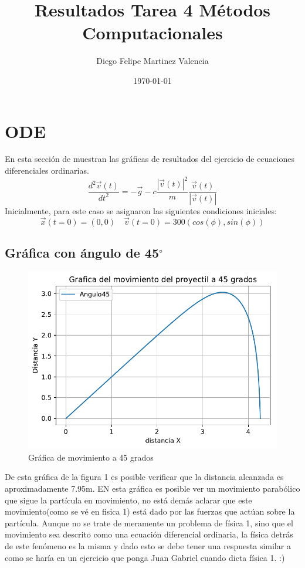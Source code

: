 \documentclass{IEEEtran}
\title{Resultados Tarea 4 Métodos Computacionales }
\author{Diego Felipe  Martinez Valencia}
\date{\today}
\begin{document}
\maketitle{}
\vspace*{-1cm}
\justify 
\section*{ODE}
En esta sección de muestran las gráficas de resultados del ejercicio de ecuaciones diferenciales ordinarias.
\begin{equation}
    \frac{d^{2}\vec{v}(t)}{dt^{2}}=-\vec{g}-c\frac{|\vec{v}(t)|^{2}}{m}\frac{\vec{v}(t)}{|\vec{v}(t)|}
\end{equation}
Inicialmente, para este caso se asignaron las siguientes condiciones iniciales:
\begin{equation}
    \vec{x}(t=0)=(0,0) \quad \vec{v}(t=0)=300(cos(\phi),sin(\phi))
\end{equation}
\subsection{Gráfica con ángulo de 45$^\circ$}
\begin{figure}[h]
    \centering
    \includegraphics[scale = 0.6]{ODE_45grados.pdf}
    \caption{Gráfica de movimiento a 45 grados}
    \label{fig:my_label}
\end{figure}
De esta gráfica de la figura 1 es posible verificar que la distancia alcanzada es aproximadamente 7.95m. EN esta gráfica es posible ver un movimiento parabólico que sigue la partícula en movimiento, no está demás aclarar que este movimiento(como se vé en fisica 1) está dado por las fuerzas que actúan sobre la partícula. Aunque no se trate de meramente un problema de física 1, sino que el movimiento sea descrito como una ecuación diferencial ordinaria, la física detrás de este fenómeno es la misma y dado esto se debe tener una respuesta similar a como se haría en un ejercicio que ponga Juan Gabriel cuando dicta física 1. :) 
\end{document}
